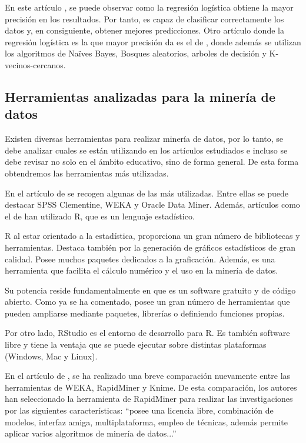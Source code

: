 En este artículo , se puede observar como la regresión logística obtiene la mayor precisión en los resultados. Por tanto, es capaz de clasificar correctamente los datos y, en consiguiente, obtener mejores predicciones. Otro artículo donde la regresión logística es la que mayor precisión da es el de , donde además se utilizan los algoritmos de Naïves Bayes, Bosques aleatorios, arboles de decisión y K-vecinos-cercanos.



\subsection{Herramientas analizadas para la minería de datos}
Existen diversas herramientas para realizar minería de datos, por lo tanto, se debe analizar cuales se están utilizando en los artículos estudiados e incluso se debe revisar no solo en el ámbito educativo, sino de forma general. De esta forma obtendremos las herramientas más utilizadas.

En el artículo de  se recogen algunas de las más utilizadas. Entre ellas se puede destacar SPSS Clementine, WEKA y Oracle Data Miner. Además, artículos como el de  han utilizado R, que es un lenguaje estadístico.

R al estar orientado a la estadística, proporciona un gran número de bibliotecas y herramientas. Destaca también por la generación de gráficos estadísticos de gran calidad. Posee muchos paquetes dedicados a la graficación. Además, es una herramienta que facilita el cálculo numérico y el uso en la minería de datos. \cite{emanuel2014}

Su potencia reside fundamentalmente en que es un software gratuito y de código abierto. Como ya se ha comentado, posee un gran número de herramientas que pueden ampliarse mediante paquetes, librerías o definiendo funciones propias.

Por otro lado, RStudio es el entorno de desarrollo para R. Es también software libre y tiene la ventaja que se puede ejecutar sobre distintas plataformas (Windows, Mac y Linux).

En el artículo de , se ha realizado una breve comparación nuevamente entre las herramientas de WEKA, RapidMiner y Knime. De esta comparación, los autores han seleccionado la herramienta de RapidMiner para realizar las investigaciones por las siguientes características: ``posee una licencia libre, combinación de modelos, interfaz amiga, multiplataforma, empleo de técnicas, además permite aplicar varios algoritmos de minería de datos...'' \cite{jaramillo2015aplicacion}

